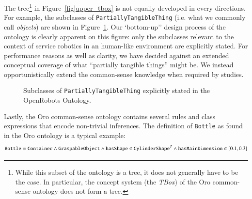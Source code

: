 \documentclass[preprint,3p,times]{elsarticle}
\newcommand{\concept}[1]{{\small \texttt{#1}}}
\newcommand{\ie}{i.e.\xspace}
\begin{document}
The tree\footnote{While this subset of the ontology is a tree, it does not
generally have to be the case. In particular, the concept system (the
\emph{TBox}) of the {\sc Oro} common-sense ontology does not form a tree.} in
Figure~\ref{fig|upper_tbox} is not equally developed in every directions. For
example, the subclasses of \concept{PartiallyTangibleThing} (\ie what we
commonly call \emph{objects}) are shown in
Figure~\ref{fig|tangible_things_tbox}. Our `bottom-up'' design process of the
ontology is clearly apparent on this figure: only the subclasses relevant to the
context of service robotics in an human-like environment are explicitly stated.
For performance reasons as well as clarity, we have decided against an extended
conceptual coverage of what ``partially tangible things'' might be. We instead
opportunistically extend the common-sense knowledge when required by studies.


\begin{figure}
    \centering

    \caption{Subclasses of \concept{PartiallyTangibleThing} explicitly stated in the
    OpenRobots Ontology.}
    \label{fig|tangible_things_tbox}
\end{figure}

Lastly, the {\sc Oro} common-sense ontology contains several rules and class
expressions that encode non-trivial inferences. The definition of
\concept{Bottle} as found in the {\sc Oro} ontology is a typical example:
$$
\text{\tt Bottle} \equiv \text{\tt Container} \wedge 
                         \text{\tt GraspableObject} \wedge
                         \text{\tt hasShape} \in \text{\tt CylinderShape}^{\mathcal{I}} \wedge
                         \text{\tt hasMainDimension} \in [0.1, 0.3]
$$
\end{document}
